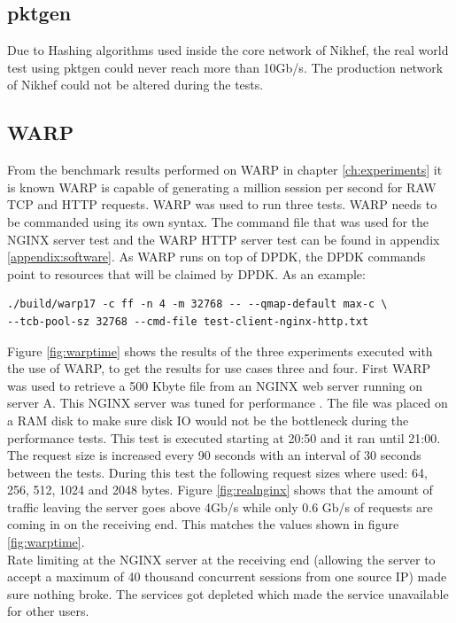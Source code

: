 \subsection{pktgen}
Due to Hashing algorithms used inside the core network of Nikhef, the real world test using pktgen could never reach more than 10Gb/s. 
The production network of Nikhef could not be altered during the tests.  



\subsection{WARP}
From the benchmark results performed on WARP in chapter \ref{ch:experiments} it is known WARP is capable of generating a million session per second for RAW TCP and HTTP requests. 
WARP was used to run three tests. WARP needs to be commanded using its own syntax. The command file that was used for the NGINX server test and the WARP HTTP server test can be found in appendix \ref{appendix:software}. As WARP runs on top of DPDK, the DPDK commands point to resources that will be claimed by DPDK. As an example:

\begin{verbatim}
./build/warp17 -c ff -n 4 -m 32768 -- --qmap-default max-c \
--tcb-pool-sz 32768 --cmd-file test-client-nginx-http.txt 
\end{verbatim} 

Figure \ref{fig:warptime} shows the results of the three experiments executed with the use of WARP, to get the results for use cases three and four. 
First WARP was used to retrieve a 500 Kbyte file from an NGINX web server running on server A. This NGINX server was tuned for performance \cite{nginxtuning}.
The file was placed on a RAM disk to make sure disk IO would not be the bottleneck during the performance tests. 
This test is executed starting at 20:50 and it ran until 21:00. The request size is increased every 90 seconds with an interval of 30 seconds between the tests.
During this test the following request sizes where used: 64, 256, 512, 1024 and 2048 bytes. 
Figure \ref{fig:realnginx} shows that the amount of traffic leaving the server goes above 4Gb/s while only 0.6 Gb/s of requests are coming in on the receiving end. 
This matches the values shown in figure \ref{fig:warptime}. \\
Rate limiting at the NGINX server at the receiving end (allowing the server to accept a maximum of 40 thousand concurrent sessions from one source IP) made sure nothing broke. The services got depleted which  made the service unavailable for other users.

